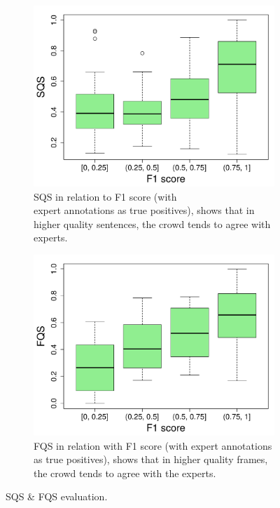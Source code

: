 \begin{itemize}
\begin{figure}[tbh!]
\centering
\begin{subfigure}{.5\textwidth}
\centering
\includegraphics[width=\linewidth]{img/sqs_f1.pdf}
\caption{SQS in relation to F1 score (with \\ expert annotations as true positives), shows that in higher quality sentences, the crowd tends to agree with experts.}
\label{fig:sqs_f1}
\end{subfigure}%
\begin{subfigure}{.5\textwidth}
\centering
\includegraphics[width=\linewidth]{img/fqs_f1.pdf}
\caption{FQS in relation with F1 score (with expert annotations as true positives), shows that in higher quality frames, the crowd tends to agree with the experts.}
\label{fig:fqs_f1}
\end{subfigure}
\caption{SQS \& FQS evaluation.}
\end{figure}


\end{itemize}
